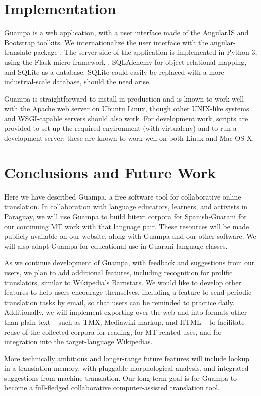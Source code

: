 \documentclass[10pt, a4paper]{article}
\begin{document}
\section{Implementation}
Guampa is a web application, with a user interface made of the AngularJS
\cite{angularjs} and Bootstrap \cite{bootstrap} toolkits. We internationalize
the user interface with the angular-translate package \cite{angular-translate}.
The server side of the application is implemented in Python 3, using the Flask
micro-framework \cite{flask}, SQLAlchemy
\cite{sqlalchemy} for object-relational mapping, and SQLite \cite{sqlite} as a
database. SQLite could easily be replaced with a more industrial-scale
database, should the need arise.

Guampa is straightforward to install in production and is known to work well
with the Apache web server on Ubuntu Linux, though other UNIX-like systems and
WSGI-capable servers should also work. For development work, scripts are
provided to set up the required environment (with virtualenv) and to run a
development server; these are known to work well on both Linux and Mac OS X.

\section{Conclusions and Future Work}
Here we have described Guampa, a free software tool for collaborative online
translation.
In collaboration with language educators, learners, and activists in Paraguay,
we will use Guampa to build bitext corpora for Spanish-Guarani for our
continuing MT work with that language pair. These resources will be made
publicly available on our website, along with Guampa and our other software.
We will also adapt Guampa for educational use in Guarani-language classes.

As we continue development of Guampa, with feedback and suggestions from our
users, we plan to add additional features, including recognition for prolific
translators, similar to Wikipedia's Barnstars. We would like to develop other
features to help users encourage themselves, including a feature to send
periodic translation tasks by email, so that users can be reminded to practice
daily. Additionally, we will implement exporting over the web and into formats
other than plain text -- such as TMX, Mediawiki markup, and HTML --  to
facilitate reuse of the collected corpora for reading, for MT-related uses, and
for integration into the target-language Wikipedias.

More technically ambitious and longer-range future features will include lookup
in a translation memory, with pluggable morphological analysis, and integrated
suggestions from machine translation. Our long-term goal is for Guampa to
become a full-fledged collaborative computer-assisted translation tool.
\end{document}

